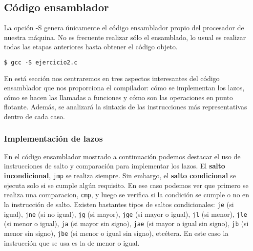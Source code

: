 \documentclass[10pt,a4paper]{article}
\begin{document}
\subsection{Código ensamblador}\label{sec:: ensamblador}
La opción -S genera únicamente el código ensamblador propio del procesador de nuestra máquina. No es frecuente realizar sólo el ensamblado, lo usual es realizar todas las etapas anteriores hasta obtener el código objeto.
\begin{lstlisting}[style=consola, numbers=none]
$ gcc -S ejercicio2.c
\end{lstlisting}

En está sección nos centraremos en tres aspectos interesantes del código ensamblador que nos proporciona el compilador: cómo se implementan los lazos, cómo se hacen las llamadas a funciones y cómo son las operaciones en punto flotante. Además, se analizará la sintaxis de las instrucciones más representativas dentro de cada caso. 


\subsubsection{Implementación de lazos}
En el código ensamblador mostrado a continuación podemos destacar el uso de instrucciones de salto y comparación para implementar los lazos.
El \textbf{salto incondicional}, \texttt{jmp} se realiza siempre. Sin embargo, el \textbf{salto condicional} se ejecuta solo si se cumple algún requisito. En ese caso podemos ver que primero se realiza una comparacion, \texttt{cmp}, y luego se verifica si la condición se cumple o no en la instrucción de salto.   Existen bastantes tipos de saltos condicionales: \texttt{je} (si igual), \texttt{jne} (si no igual), \texttt{jg} (si mayor), \texttt{jge} (si mayor o igual), \texttt{jl} (si menor), \texttt{jle} (si menor o igual), \texttt{ja} (si mayor sin signo), \texttt{jae} (si mayor o igual sin signo), \texttt{jb} (si menor sin signo), \texttt{jbe} (si menor o igual sin signo), etcétera. En este caso la instrucción que se usa es la de menor o igual. 
\end{document}
